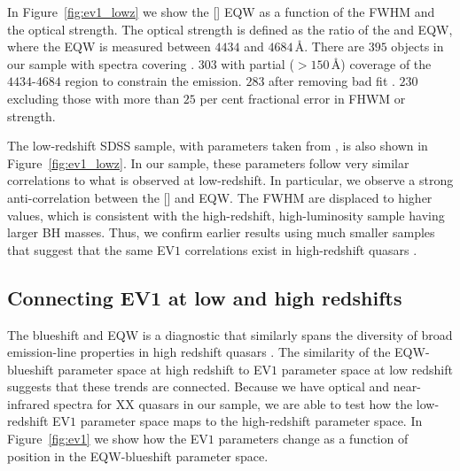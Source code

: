In Figure~\ref{fig:ev1_lowz} we show the [] EQW as a function of the \hb FWHM and the optical  strength. 
The optical  strength is defined as the ratio of the  and \hb EQW, where the  EQW is measured between $4434$ and $4684$\,\AA.
There are $395$ objects in our sample with spectra covering \hb. 
$303$ with partial ($>150$\,\AA) coverage of the $4434$-$4684$ region to constrain the  emission.
$283$ after removing bad fit . 
$230$ excluding those with more than $25$ per cent fractional error in \hb FHWM or  strength. 

The low-redshift SDSS sample, with parameters taken from \citet{shen11}, is also shown in Figure~\ref{fig:ev1_lowz}.
In our sample, these parameters follow very similar correlations to what is observed at low-redshift.
In particular, we observe a strong anti-correlation between the [] and  EQW.  
The \hb FWHM are displaced to higher values, which is consistent with the high-redshift, high-luminosity sample having larger BH masses. 
Thus, we confirm earlier results using much smaller samples that suggest that the same EV$1$ correlations exist in high-redshift quasars \citep[e.g.][]{netzer04,sulentic04,sulentic06,runnoe13,shen16a}.

\subsection{Connecting EV1 at low and high redshifts}
\label{sec:ch4_low_high_ev1}

The  blueshift and EQW is a diagnostic that similarly spans the diversity of broad emission-line properties in high redshift quasars \citep{sulentic07,richards11}. 
The similarity of the  EQW-blueshift parameter space at high redshift to EV$1$ parameter space at low redshift suggests that these trends are connected. 
Because we have optical and near-infrared spectra for XX quasars in our sample, we are able to test how the low-redshift EV$1$ parameter space maps to the high-redshift  parameter space.
In Figure~\ref{fig:ev1} we show how the EV$1$ parameters change as a function of position in the  EQW-blueshift parameter space.

